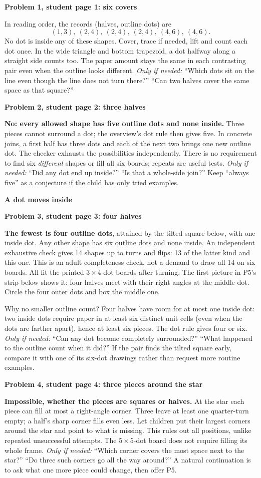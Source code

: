 \documentclass[11pt]{article}
\newcommand{\head}[1]{\par\textbf{\large #1}\par}
\newcommand{\sub}[1]{\par\textbf{#1}\par}
\newcommand{\hint}[1]{\textit{Only if needed:} #1}
\begin{document}
\sub{Problem 1, student page 1: six covers}
In reading order, the records (halves, outline dots) are
\[
(1,3),\ (2,4),\ (2,4),\ (2,4),\ (4,6),\ (4,6).
\]
No dot is inside any of these shapes. Cover, trace if needed, lift and count each dot once. In the wide triangle and bottom trapezoid, a dot halfway along a straight side counts too. The paper amount stays the same in each contrasting pair even when the outline looks different. \hint{``Which dots sit on the line even though the line does not turn there?'' ``Can two halves cover the same space as that square?''}

\sub{Problem 2, student page 2: three halves}
\textbf{No: every allowed shape has five outline dots and none inside.} Three pieces cannot surround a dot; the overview's dot rule then gives five. In concrete joins, a first half has three dots and each of the next two brings one new outline dot. The checker exhausts the possibilities independently. There is no requirement to find six \emph{different} shapes or fill all six boards; repeats are useful tests. \hint{``Did any dot end up inside?'' ``Is that a whole-side join?''} Keep ``always five'' as a conjecture if the child has only tried examples.
\newpage
\head{A dot moves inside}
\sub{Problem 3, student page 3: four halves}
\textbf{The fewest is four outline dots}, attained by the tilted square below, with one inside dot. Any other shape has six outline dots and none inside. An independent exhaustive check gives 14 shapes up to turns and flips: 13 of the latter kind and this one. This is an adult completeness check, not a demand to draw all 14 on six boards. All fit the printed $3\times4$-dot boards after turning.
The first picture in P5's strip below shows it: four halves meet with their right angles at the middle dot. Circle the four outer dots and box the middle one.

Why no smaller outline count? Four halves have room for at most one inside dot: two inside dots require paper in at least six distinct unit cells (even when the dots are farther apart), hence at least six pieces. The dot rule gives four or six. \hint{``Can any dot become completely surrounded?'' ``What happened to the outline count when it did?''} If the pair finds the tilted square early, compare it with one of its six-dot drawings rather than request more routine examples.

\sub{Problem 4, student page 4: three pieces around the star}
\textbf{Impossible, whether the pieces are squares or halves.} At the star each piece can fill at most a right-angle corner. Three leave at least one quarter-turn empty; a half's sharp corner fills even less. Let children put their largest corners around the star and point to what is missing. This rules out all positions, unlike repeated unsuccessful attempts. The $5\times5$-dot board does not require filling its whole frame. \hint{``Which corner covers the most space next to the star?'' ``Do three such corners go all the way around?''} A natural continuation is to ask what one more piece could change, then offer P5.
\end{document}
